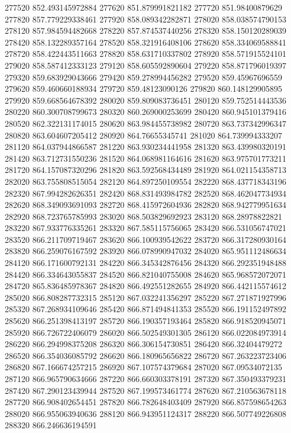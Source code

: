 {277520 852.493145972884
277620 851.879991821182
277720 851.98400879629
277820 857.779229338461
277920 858.089342282871
278020 858.038574790153
278120 857.984594482668
278220 857.874537440256
278320 858.150120289039
278420 858.132289357164
278520 858.321916408106
278620 858.334069588841
278720 858.422443511663
278820 858.631710337802
278920 858.571915524101
279020 858.587412333123
279120 858.605592890604
279220 858.871796019397
279320 859.683929043666
279420 859.278994456282
279520 859.45967696559
279620 859.460660188934
279720 859.48123090126
279820 860.148129905895
279920 859.668564678392
280020 859.809083736451
280120 859.752514443536
280220 860.300708799673
280320 860.269000253699
280420 860.945101379416
280520 862.322131174015
280620 863.984455738982
280720 863.737342996347
280820 863.604607205412
280920 864.76655345741
281020 864.739994333207
281120 864.037944866587
281220 863.930234441958
281320 863.439980320191
281420 863.712731550236
281520 864.068981164616
281620 863.975701773211
281720 864.157087320296
281820 863.592568434489
281920 864.021154358713
282020 863.755808515054
282120 864.897250109554
282220 868.437718343196
282320 867.994282626351
282420 868.831493984782
282520 868.462047734934
282620 868.349093691093
282720 868.415972604936
282820 868.942779951634
282920 868.723765785993
283020 868.503829692923
283120 868.28978822821
283220 867.933776335261
283320 867.585115756065
283420 866.531056747021
283520 866.211709719467
283620 866.100939542622
283720 866.317280930164
283820 866.259076167592
283920 866.078990947032
284020 865.951112486634
284120 866.171600792131
284220 866.345342876456
284320 866.292351948488
284420 866.334643055837
284520 866.821040755008
284620 865.968572072071
284720 865.836485978367
284820 866.492551282655
284920 866.442115574612
285020 866.808287732315
285120 867.032241356297
285220 867.271871927996
285320 867.268934109646
285420 866.871494841353
285520 866.191152497892
285620 866.251398413197
285720 866.190357193464
285820 866.918520945071
285920 866.726722406079
286020 866.502549301305
286120 866.022084973914
286220 866.294998375208
286320 866.306154730851
286420 866.32404479272
286520 866.354036085792
286620 866.180965656822
286720 867.263223723406
286820 867.166674257215
286920 867.107574379684
287020 867.09534072135
287120 866.965790634666
287220 866.660303378191
287320 867.350493379231
287420 867.290123439944
287520 867.199573461774
287620 867.210563678118
287720 866.908402654451
287820 866.782648403409
287920 866.857598654263
288020 866.955063940636
288120 866.943951124317
288220 866.507749226808
288320 866.246636194591
}

